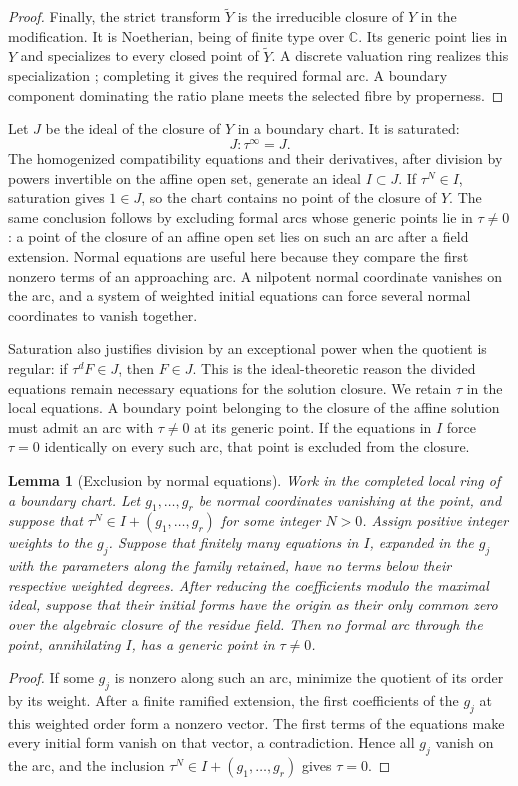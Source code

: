 \documentclass[11pt,a4paper]{article}
\numberwithin{equation}{section}
\theoremstyle{plain}
\newtheorem{lemma}[theorem]{Lemma}
\theoremstyle{definition}
\theoremstyle{remark}
\begin{document}
\begin{proof}
Finally, the strict transform $\widetilde Y$ is the irreducible closure
of $Y$ in the modification. It is Noetherian, being of finite type
over $\mathbb C$. Its generic point lies in $Y$ and
specializes to every closed point of $\widetilde Y$.
A discrete valuation ring realizes this specialization
\cite[Lemma~28.5.10, Tag~054F]{StacksProject}; completing it gives
the required formal arc. A boundary component
dominating the ratio plane meets the selected fibre by properness.
\end{proof}

Let $J$
be the ideal of the closure of $Y$ in a
boundary chart. It is saturated:
\[
 J:\tau^\infty=J.
\]
The homogenized compatibility equations and their derivatives, after
division by powers invertible on the affine open set, generate an ideal
$I\subset J$. If $\tau^N\in I$, saturation gives $1\in J$, so the
chart contains no point of the closure of $Y$. The same conclusion
follows by excluding formal arcs whose generic points lie in
$\tau\ne0$: a point of the closure of an affine open set lies on such
an arc after a field extension. Normal equations are useful here
because they compare the first nonzero terms of an approaching arc.
A nilpotent normal coordinate vanishes on the arc, and a system of
weighted initial equations can force several normal coordinates to
vanish together.

Saturation also justifies division by an exceptional power when
the quotient is regular: if $\tau^dF\in J$, then $F\in J$.
This is the ideal-theoretic reason the divided equations remain
necessary equations for the solution closure. We retain $\tau$
in the local equations. A boundary point belonging to the closure
of the affine solution must admit an arc with $\tau\ne0$ at its
generic point. If the equations in $I$ force $\tau=0$ identically
on every such arc, that point is excluded from the closure.

\begin{lemma}[Exclusion by normal equations]\label{r3:normalexclusion}
Work in the completed local ring of a boundary chart. Let
$g_1,\ldots,g_r$ be normal coordinates vanishing at the point, and
suppose that $\tau^N\in I+(g_1,\ldots,g_r)$ for some integer $N>0$.
Assign positive integer weights to the $g_j$. Suppose that finitely
many equations in $I$, expanded in the $g_j$ with the parameters along
the family retained, have no terms below their respective weighted
degrees. After reducing the coefficients modulo the maximal ideal,
suppose that their initial forms have the origin as their only common
zero over the algebraic closure of the residue field.
Then no formal arc through the point, annihilating $I$, has a generic
point in $\tau\ne0$.
\end{lemma}
\begin{proof}
If some $g_j$ is nonzero along such an arc, minimize the quotient of
its order by its weight. After a finite ramified extension, the first
coefficients of the $g_j$ at this weighted order form a nonzero vector.
The first terms of the equations make every initial form vanish on
that vector, a contradiction. Hence all $g_j$ vanish on the arc, and
the inclusion $\tau^N\in I+(g_1,\ldots,g_r)$ gives $\tau=0$.
\end{proof}
\end{document}
